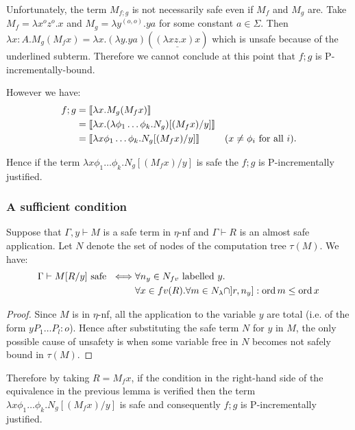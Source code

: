  

Unfortunately, the term $M_{f;g}$ is not necessarily safe even if $M_f$ and $M_g$ are. Take $M_f = \lambda x^o z^o.x$ and
$M_g = \lambda y^{(o,o)} . y a$ for some constant $a\in \Sigma$.
Then $\lambda x:A . M_g (M_f x) = \lambda x . (\lambda y . y a) ( \underline{(\lambda x z.x) x} )$ which is unsafe because of the underlined subterm. Therefore we cannot conclude at this point that $f;g$ is P-incrementally-bound.

However we have:
\begin{align*}
f;g &= {[\![ \lambda x . M_g (M_f x) ]\!]} \\
 &= {[\![ \lambda x . (\lambda \phi_1\ldots \phi_k . N_g) [(M_f x) / y] ]\!]} \\
&= {[\![ \lambda x \phi_1 \dots \phi_k. N_g [(M_f x) / y] ]\!]}
& \mbox{($x\neq\phi_i$ for all $i$)}.
\end{align*}

Hence if the term  $\lambda x \phi_1 \dots \phi_k. N_g [(M_f x) / y]$ is safe the $f;g$ is P-incrementally justified.

\subsubsection{A sufficient condition}
\begin{lemma}
Suppose that $\Gamma,y \vdash M$ is a safe term in $\eta$-nf and $\Gamma \vdash R$ is an almost safe application. Let $N$ denote the set of nodes of the computation tree $\tau(M)$. We have:
\begin{align*}
\Gamma \vdash M[R/y] \mbox{ safe } 
\iff& \forall n_y \in N_{fv} \mbox{ labelled $y$}. \\
  &\forall x \in fv(R) . \forall m \in N_{\lambda} \cap ]r,n_y] : \mathop{\mathrm{ord}}{m} \leq \mathop{\mathrm{ord}}{x}
\end{align*}
\end{lemma}
\begin{proof}
Since $M$ is in $\eta$-nf, all the application to the variable $y$ are total (i.e. of the form $y P_1 \ldots P_l :o$). Hence after substituting the safe term $N$ for $y$ in $M$, the only possible cause of unsafety is when
some variable free in $N$ becomes not safely bound in $\tau(M)$.
\end{proof}

Therefore by taking $R= M_f x$, if the condition in the right-hand side of the equivalence in the previous lemma is verified  then the term   $\lambda x \phi_1 \dots \phi_k. N_g [(M_f x) / y]$ is safe and consequently $f;g$ is P-incrementally justified.

